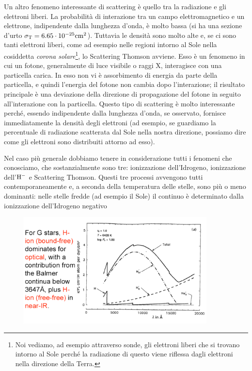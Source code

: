 Un altro fenomeno interessante di scattering è quello tra la radiazione e gli elettroni liberi. La probabilità di interazione tra un campo elettromagnetico e un elettrone, indipendente dalla lunghezza d'onda, è molto bassa (si ha una sezione d'urto $\rm \sigma_T= 6.65 \cdot 10^{-25}cm^2$). Tuttavia le densità sono molto alte e, se ci sono tanti elettroni liberi, come ad esempio nelle regioni intorno al Sole nella cosiddetta \textit{corona solare}\footnote{Noi vediamo, ad esempio attraverso sonde, gli elettroni liberi che si trovano intorno al Sole perché la radiazione di questo viene riflessa dagli elettroni nella direzione della Terra.}, lo Scattering Thomson avviene. Esso è un fenomeno in cui un fotone, generalmente di luce visibile o raggi X, interagisce con una particella carica. In esso non vi è assorbimento di energia da parte della particella, e quindi l'energia del fotone non cambia dopo l'interazione; il risultato principale è una deviazione della direzione di propagazione del fotone in seguito all'interazione con la particella. Questo tipo di scattering è molto interessante perché, essendo indipendente dalla lunghezza d'onda, se osservato, fornisce immediatamente la densità degli elettroni (ad esempio, se guardiamo la percentuale di radiazione scatterata dal Sole nella nostra direzione, possiamo dire come gli elettroni sono distribuiti attorno ad esso).

Nel caso più generale dobbiamo tenere in considerazione tutti i fenomeni che conosciamo, che sostanzialmente sono tre: ionizzazione dell'Idrogeno, ionizzazione dell'$\rm H^-$ e Scattering Thomson. Questi tre processi avvengono tutti contemporaneamente e, a seconda della temperatura delle stelle, sono più o meno dominanti: nelle stelle fredde (ad esempio il Sole) il continuo è determinato dalla ionizzazione dell'Idrogeno negativo

\begin{figure}[H]
  \centering
  \includegraphics[width=10cm]{immagini/spettro_stelle_solari.png}
\end{figure}

